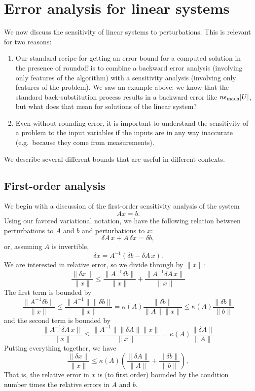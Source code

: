 \documentclass[12pt, leqno]{article} %
\begin{document}
\section{Error analysis for linear systems}

We now discuss the sensitivity of linear systems to perturbations.
This is relevant for two reasons:
\begin{enumerate}
\item Our standard recipe for getting an error bound for a computed
  solution in the presence of roundoff is to combine a backward
  error analysis (involving only features of the algorithm) with
  a sensitivity analysis (involving only features of the problem).
  We saw an example above: we know that the standard back-substitution
  process results in a backward error like $n \epsilon_{\mathrm{mach}} |U|$, but what
  does that mean for solutions of the linear system?
\item Even without rounding error, it is important to understand
  the sensitivity of a problem to the input variables if the inputs
  are in any way inaccurate (e.g.~because they come from measurements).
\end{enumerate}
We describe several different bounds that are useful in different
contexts.

\subsection{First-order analysis}

We begin with a discussion of the first-order sensitivity analysis
of the system
\[
  Ax = b.
\]
Using our favored variational notation, we have the following relation
between perturbations to $A$ and $b$ and perturbations to $x$:
\[
  \delta A \, x + A \, \delta x = \delta b,
\]
or, assuming $A$ is invertible,
\[
  \delta x = A^{-1} (\delta b - \delta A \, x).
\]
We are interested in relative error, so we divide through by $\|x\|$:
\[
  \frac{\|\delta x\|}{\|x\|} \leq
  \frac{\|A^{-1} \delta b \|}{\|x\|} + \frac{\|A^{-1} \delta A \, x\|}{\|x\|}
\]
The first term is bounded by
\[
  \frac{\|A^{-1} \delta b \|}{\|x\|} \leq
  \frac{\|A^{-1}\| \|\delta b\|}{\|x\|} =
  \kappa(A) \frac{\|\delta b\|}{\|A\| \|x\|} \leq
  \kappa(A) \frac{\|\delta b\|}{\|b\|}
\]
and the second term is bounded by
\[
  \frac{\|A^{-1} \delta A \, x\|}{\|x\|} \leq
  \frac{\|A^{-1} \| \|\delta A\| \|x\|}{\|x\|} =
  \kappa(A) \frac{\|\delta A\|}{\|A\|}
\]
Putting everything together, we have
\[
  \frac{\|\delta x\|}{\|x\|} \leq\kappa(A)
    \left( \frac{\|\delta A\|}{\|A\|} + \frac{\|\delta b\|}{\|b\|} \right),
\]
That is, the relative error in $x$ is (to first order) bounded by the
condition number times the relative errors in $A$ and $b$.
\end{document}
